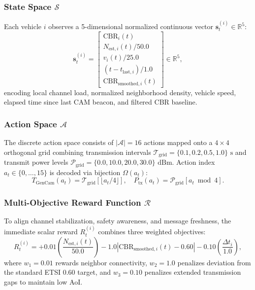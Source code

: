 \documentclass[journal]{IEEEtran}
\begin{document}
\subsubsection{State Space $\mathcal{S}$}
Each vehicle $i$ observes a 5-dimensional normalized continuous vector $\mathbf{s}_t^{(i)} \in \mathbb{R}^5$:
\begin{equation}
\label{eq:state_vector}
\mathbf{s}_t^{(i)} = \begin{bmatrix}
\text{CBR}_i(t) \\
N_{\text{est}, i}(t) / 50.0 \\
v_i(t) / 25.0 \\
(t - t_{\text{last}, i}) / 1.0 \\
\text{CBR}_{\text{smoothed}, i}(t)
\end{bmatrix} \in \mathbb{R}^5,
\end{equation}
encoding local channel load, normalized neighborhood density, vehicle speed, elapsed time since last CAM beacon, and filtered CBR baseline.

\subsubsection{Action Space $\mathcal{A}$}
The discrete action space consists of $|\mathcal{A}| = 16$ actions mapped onto a $4 \times 4$ orthogonal grid combining transmission intervals $\mathcal{T}_{\text{grid}} = \{0.1, 0.2, 0.5, 1.0\}\text{ s}$ and transmit power levels $\mathcal{P}_{\text{grid}} = \{0.0, 10.0, 20.0, 30.0\}\text{ dBm}$. Action index $a_t \in \{0, \dots, 15\}$ is decoded via bijection $\Omega(a_t)$:
\begin{equation}
\label{eq:action_decoding}
T_{\text{GenCam}}(a_t) = \mathcal{T}_{\text{grid}}[\lfloor a_t / 4 \rfloor], \quad P_{\text{tx}}(a_t) = \mathcal{P}_{\text{grid}}[a_t \bmod 4].
\end{equation}

\subsubsection{Multi-Objective Reward Function $\mathcal{R}$}
To align channel stabilization, safety awareness, and message freshness, the immediate scalar reward $R_t^{(i)}$ combines three weighted objectives:
\begin{equation}
\label{eq:reward_multi}
R_t^{(i)} = +0.01 \left(\frac{N_{\text{est}, i}(t)}{50.0}\right) - 1.0 |\text{CBR}_{\text{smoothed}, i}(t) - 0.60| - 0.10 \left(\frac{\Delta t_i}{1.0}\right),
\end{equation}
where $w_1 = 0.01$ rewards neighbor connectivity, $w_2 = 1.0$ penalizes deviation from the standard ETSI 0.60 target, and $w_3 = 0.10$ penalizes extended transmission gaps to maintain low AoI.
\end{document}
